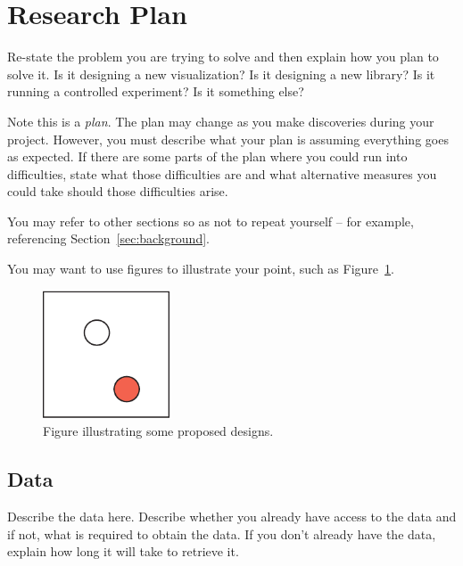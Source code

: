 \section{Research Plan} 
\label{sec:research}

Re-state the problem you are trying to solve and then explain how you plan to
solve it. Is it designing a new visualization? Is it designing a new library?
Is it running a controlled experiment? Is it something else?

Note this is a {\em plan}. The plan may change as you make discoveries during
your project. However, you must describe what your plan is assuming everything
goes as expected. If there are some parts of the plan where you could run into
difficulties, state what those difficulties are and what alternative measures
you could take should those difficulties arise.

You may refer to other sections so as not to repeat yourself -- for example,
referencing Section~\ref{sec:background}.

You may want to use figures to illustrate your point, such as
Figure~\ref{fig:sample}.

\begin{figure}[h]
 \centering %
 \includegraphics[width=1.5in]{figs/sample}
 \caption{Figure illustrating some proposed designs.}
 \label{fig:sample}
\end{figure}

\subsection{Data}
\label{sec:data}

Describe the data here. Describe whether you already have access to the data
and if not, what is required to obtain the data. If you don't already have the
data, explain how long it will take to retrieve it. 

